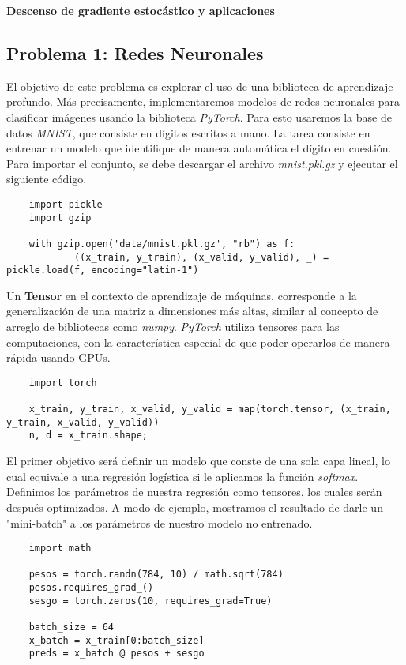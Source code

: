 \vspace{0.3cm}
\begin{center}
{\huge \textbf{Descenso de gradiente estocástico y aplicaciones}}
\end{center}

\subsection*{Problema 1: Redes Neuronales}
El objetivo de este problema es explorar el uso de una biblioteca de aprendizaje profundo. Más precisamente, implementaremos modelos de redes neuronales para clasificar imágenes usando la biblioteca \textit{PyTorch}. Para esto usaremos la base de datos \textit{MNIST}, que consiste en dígitos escritos a mano. La tarea consiste en entrenar un modelo que identifique de manera automática el dígito en cuestión. Para importar el conjunto, se debe descargar el archivo \textit{mnist.pkl.gz} y ejecutar el siguiente código.

\begin{verbatim}
    import pickle
    import gzip
    
    with gzip.open('data/mnist.pkl.gz', "rb") as f:
            ((x_train, y_train), (x_valid, y_valid), _) = pickle.load(f, encoding="latin-1")
\end{verbatim}

Un \textbf{Tensor} en el contexto de aprendizaje de máquinas, corresponde a la generalización de una matriz a dimensiones más altas, similar al concepto de arreglo de bibliotecas como \textit{numpy}. \textit{PyTorch} utiliza tensores para las computaciones, con la característica especial de que poder operarlos de manera rápida usando GPUs.

\begin{verbatim}
    import torch

    x_train, y_train, x_valid, y_valid = map(torch.tensor, (x_train, y_train, x_valid, y_valid))
    n, d = x_train.shape;
\end{verbatim}

El primer objetivo será definir un modelo que conste de una sola capa lineal, lo cual equivale a una regresión logística si le aplicamos la función \textit{softmax}. Definimos los parámetros de nuestra regresión como tensores, los cuales serán después optimizados. A modo de ejemplo, mostramos el resultado de darle un "mini-batch" a los parámetros de nuestro modelo no entrenado.

\begin{verbatim}
    import math

    pesos = torch.randn(784, 10) / math.sqrt(784)
    pesos.requires_grad_()
    sesgo = torch.zeros(10, requires_grad=True)
    
    batch_size = 64
    x_batch = x_train[0:batch_size]
    preds = x_batch @ pesos + sesgo
\end{verbatim}

